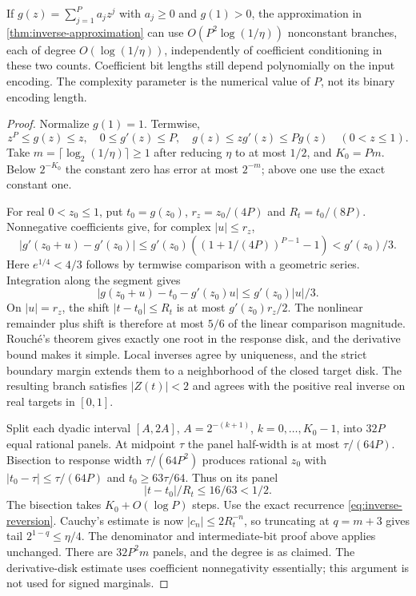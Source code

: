 \begin{proposition}
\label{prop:positive-inverse}
If $g(z)=\sum_{j=1}^P a_jz^j$ with $a_j\ge0$ and $g(1)>0$,
the approximation in \cref{thm:inverse-approximation} can use
$O(P^2\log(1/\eta))$ nonconstant branches, each of degree
$O(\log(1/\eta))$, independently of coefficient conditioning in these
two counts. Coefficient bit lengths still depend polynomially on the
input encoding. The complexity parameter is the numerical value of $P$,
not its binary encoding length.
\end{proposition}
\begin{proof}
Normalize $g(1)=1$. Termwise,
\[
 z^P\le g(z)\le z,\quad 0\le g'(z)\le P,\quad
                g(z)\le zg'(z)\le Pg(z)\quad(0<z\le1).
\]
Take $m=\lceil\log_2(1/\eta)\rceil\ge1$ after reducing
$\eta$ to at most $1/2$, and $K_0=Pm$. Below $2^{-K_0}$ the
constant zero has error at most $2^{-m}$; above one use the exact
constant one.

For real $0<z_0\le1$, put $t_0=g(z_0)$,
$r_z=z_0/(4P)$ and $R_t=t_0/(8P)$. Nonnegative coefficients give,
for complex $|u|\le r_z$,
\[
 |g'(z_0+u)-g'(z_0)|
 \le g'(z_0)((1+1/(4P))^{P-1}-1)<g'(z_0)/3.
\]
Here $e^{1/4}<4/3$ follows by termwise comparison with a geometric
series. Integration along the segment gives
\[
 |g(z_0+u)-t_0-g'(z_0)u|\le g'(z_0)|u|/3.
\]
On $|u|=r_z$, the shift $|t-t_0|\le R_t$ is at most
$g'(z_0)r_z/2$. The nonlinear remainder plus shift is therefore
at most $5/6$ of the linear comparison magnitude. Rouch\'e's theorem
gives exactly one root in the response disk, and the derivative bound
makes it simple. Local inverses agree by uniqueness, and the strict boundary
margin extends them to a neighborhood of the closed target disk.
The resulting branch satisfies $|Z(t)|<2$ and agrees with the
positive real inverse on real targets in $[0,1]$.

Split each dyadic interval $[A,2A]$, $A=2^{-(k+1)}$,
$k=0,\ldots,K_0-1$, into $32P$ equal rational panels. At midpoint
$\tau$ the panel half-width is at most $\tau/(64P)$.
Bisection to response width $\tau/(64P^2)$ produces rational
$z_0$ with $|t_0-\tau|\le\tau/(64P)$ and
$t_0\ge63\tau/64$. Thus on its panel
\[
             |t-t_0|/R_t\le16/63<1/2.
\]
The bisection takes $K_0+O(\log P)$ steps. Use the exact recurrence
\eqref{eq:inverse-reversion}. Cauchy's estimate is now
$|c_n|\le2R_t^{-n}$, so truncating at $q=m+3$ gives tail
$2^{1-q}\le\eta/4$. The denominator and intermediate-bit proof
above applies unchanged. There are $32P^2m$ panels, and the degree is
as claimed. The derivative-disk estimate uses coefficient nonnegativity
essentially; this argument is not used for signed marginals.
\end{proof}
